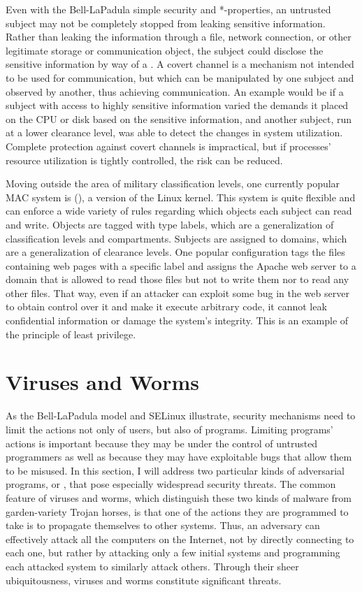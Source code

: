 Even with the Bell-LaPadula simple security and *-properties, an
untrusted subject may not be completely stopped from leaking sensitive
information.  Rather than leaking the information through a file,
network connection, or other legitimate storage or communication
object, the subject could disclose the sensitive information by way of
a .  A covert channel is a mechanism not
intended to be used for communication, but which can be manipulated by
one subject and observed by another, thus achieving communication.  An
example would be if a subject with access to highly sensitive
information varied the demands it placed on the CPU or disk based on
the sensitive information, and another subject, run at a lower
clearance level, was able to detect the changes in system utilization.
Complete protection against covert channels is impractical, but if
processes' resource utilization is tightly controlled, the risk can be
reduced.

Moving outside the area of military classification levels, one
currently popular MAC system is 
(), a version of the Linux kernel.  This system is
quite flexible and can enforce a wide variety of rules regarding
which objects each subject can read and write.  Objects are tagged
with type labels, which are a generalization of classification levels
and compartments.  Subjects are assigned to domains, which are a
generalization of clearance levels.  One popular configuration tags
the files containing web pages with a specific label and assigns the
Apache web server to a domain that is allowed to read those files but
not to write them nor to read any other files.  That way, even if an
attacker can exploit some bug in the web server to obtain control over
it and make it execute arbitrary code, it cannot leak confidential
information or damage the system's integrity.  This is an example of
the principle of least privilege.

\section{Viruses and Worms}\label{viruses-and-worms-section}

As the Bell-LaPadula model and SELinux illustrate, security mechanisms need to
limit the actions not only of users, but also of programs.  Limiting
programs' actions is important because they may be under the control
of untrusted programmers as well as because they may have exploitable
bugs that allow them to be misused.
In this section, I will address two
particular kinds of adversarial programs, or , that
pose especially widespread security threats.  The common feature of
viruses and worms, which distinguish these two kinds of malware from
garden-variety Trojan horses, is that one of the actions they are
programmed to take is to propagate themselves to other systems.  Thus,
an adversary can effectively attack all the computers on the Internet,
not by directly connecting to each one, but rather by attacking only a
few initial systems and programming each attacked system to similarly
attack others.  Through their sheer ubiquitousness, viruses and worms
constitute significant threats.

